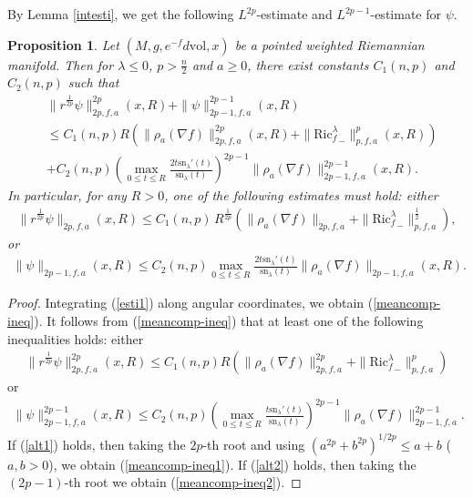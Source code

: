\documentclass[11pt]{amsart}
\numberwithin{equation}{section}
\newtheorem{proposition}[theorem]{Proposition}
\newcommand{\sn}{\mathrm{sn}}
\begin{document}
By Lemma \ref{intesti}, we get the following
$L^{2p}$-estimate and $L^{2p-1}$-estimate for $\psi$.
\begin{proposition}\label{meancomp}
	Let $(M,g,e^{-f}d\mathrm{vol},x)$ be a pointed weighted Riemannian manifold. Then for $\lambda\leq 0$, $p>\frac{n}{2}$ and $a\geq 0$, there exist constants $C_1(n,p)$ and $C_2(n,p)$ such that
	\begin{equation}
		\begin{aligned}
			&\|r^{\frac{1}{2p}}\psi\|^{2p}_{2p,f,a}(x,R)+\|\psi\|^{2p-1}_{2p-1,f,a}(x,R)\\
			&\leq C_1(n,p)R\left(\|\rho_a(\nabla f)\|^{2p}_{2p,f,a}(x,R)+\|{\mathrm{Ric}_f^\lambda}_-\|^p_{p,f,a}(x,R)\right)\\ &+C_2(n,p)\left(\max_{0\leq t\leq R}\frac{2t\sn_\lambda'(t)}{\sn_\lambda(t)}\right)^{2p-1}\|\rho_a(\nabla f)\|^{2p-1}_{2p-1,f,a}(x,R).
		\end{aligned}\label{meancomp-ineq}
	\end{equation}
	In particular, for any $R>0$, one of the following
	estimates must hold: either
	\begin{align}
		\|r^{\frac{1}{2p}}\psi\|_{2p,f,a}(x,R)
		\le C_1(n,p)\,R^{\frac{1}{2p}}\left(\|\rho_a(\nabla f)\|_{2p,f,a}+\|{\mathrm{Ric}_f^\lambda}_-\|^{\frac{1}{2}}_{p,f,a}\right),\label{meancomp-ineq1}
	\end{align}
	or
	\begin{align}
		\|\psi\|_{2p-1,f,a}(x,R)
		\le C_2(n,p)\max_{0\leq t\leq R}\frac{2t\sn_\lambda'(t)}{\sn_\lambda(t)}\|\rho_a(\nabla f)\|_{2p-1,f,a}(x,R).\label{meancomp-ineq2}
	\end{align}
\end{proposition}

\begin{proof}
	Integrating (\ref{esti1}) along angular coordinates, we obtain (\ref{meancomp-ineq}). It follows from (\ref{meancomp-ineq}) that at least one of the following inequalities holds: either
	\begin{align}
		\|r^{\frac{1}{2p}}\psi\|^{2p}_{2p,f,a}(x,R)\leq C_1(n,p)R\left(\|\rho_a(\nabla f)\|^{2p}_{2p,f,a}+\|{\mathrm{Ric}_f^\lambda}_-\|^p_{p,f,a}\right) \label{alt1}
	\end{align}
	or	
	\begin{align}
		\|\psi\|^{2p-1}_{2p-1,f,a}(x,R)\leq C_2(n,p)\left(\max_{0\leq t\leq R}\frac{t\sn_\lambda'(t)}{\sn_\lambda(t)}\right)^{2p-1}\|\rho_a(\nabla f)\|^{2p-1}_{2p-1,f,a}.\label{alt2}
	\end{align}
	If (\ref{alt1}) holds, then taking the $2p$-th root and using $\left(a^{2p}+b^{2p}\right)^{1/2p}\leq a+b$ ($a,b>0$), we obtain (\ref{meancomp-ineq1}).
	If (\ref{alt2}) holds, then taking the $(2p-1)$-th root we obtain (\ref{meancomp-ineq2}).
\end{proof}
\end{document}
